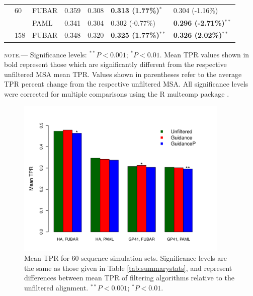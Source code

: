 \documentclass[11pt]{article}
\begin{document}
\begin{table}[htbp]
\begin{adjustwidth}{-1.85cm}{}
\begin{tabular}{l l l l l l l}
 \hline
 & 60 & FUBAR & 0.359 & 0.308 & \textbf{0.313 (1.77\%)$^{\ast}$} & 0.304 (-1.16\%)\\
 & & PAML & 0.341 & 0.304 & 0.302 (-0.77\%) & \textbf{0.296 (-2.71\%)$^{\ast\ast}$} \\
 \hline
 & 158 & FUBAR & 0.348 & 0.320 & \textbf{0.325 (1.77\%)$^{\ast\ast}$} & \textbf{0.326 (2.02\%)$^{\ast\ast}$} \\
 \hline
\end{tabular}
\newline
\textsc{note.}--- Significance levels:  $^{\ast\ast} P < 0.001$; $^{\ast} P < 0.01$. Mean TPR values shown in bold represent those which are significantly different from the respective unfiltered MSA mean TPR. Values shown in parentheses refer to the average TPR percent change from the respective unfiltered MSA. All significance levels were corrected for multiple comparisons using the R multcomp package \citep{Hothorn2008}.
\end{adjustwidth}
\end{table}

\bigskip

\begin{figure}[H]
\centerline{\includegraphics[width=4in]{Figures/barplot_prk.pdf}}
\caption{\label{barplot} Mean TPR for 60-sequence simulation sets. Significance levels are the same as those given in Table \ref{tab:summarystats}, and represent differences between mean TPR of filtering algorithms relative to the unfiltered alignment. $^{\ast\ast} P < 0.001$; $^{\ast} P < 0.01$. }
\end{figure}

\bigskip
\end{document}
